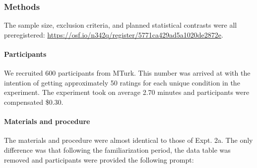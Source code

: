 \documentclass[floatsintext,doc]{apa6}
\let\oldparagraph\paragraph
\renewcommand{\paragraph}[1]{\oldparagraph{#1}\mbox{}}
\let\rmarkdownfootnote\footnote%
\def\footnote{\protect\rmarkdownfootnote}
\begin{document}

\hypertarget{methods-3}{%
\subsubsection{Methods}\label{methods-3}}

The sample size, exclusion criteria, and planned statistical contrasts were all preregistered: \url{https://osf.io/n342q/register/5771ca429ad5a1020de2872e}.

\hypertarget{participants-4}{%
\paragraph{Participants}\label{participants-4}}
%
We recruited 600 participants from MTurk.
This number was arrived at with the intention of getting approximately 50 ratings for each unique condition in the experiment.
The experiment took on average 2.70 minutes and participants were compensated \$0.30.

\hypertarget{materials-and-procedure}{%
\paragraph{Materials and procedure}\label{materials-and-procedure}}
%
The materials and procedure were almost identical to those of Expt. 2a.
The only difference was that following the familiarization period, the data table was removed and participants were provided the following prompt:
\end{document}
